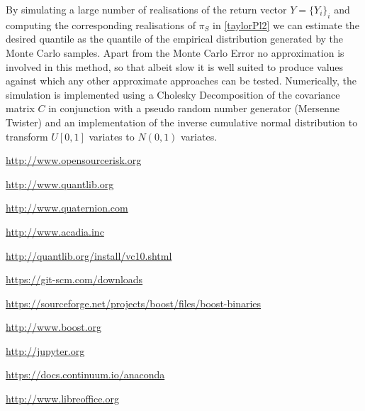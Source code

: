 \documentclass[12pt, a4paper]{article}
\begin{document}
{\begin{appendix}
By simulating a large number of realisations of the return vector $Y=\{ Y_i \}_i$ and computing the corresponding
realisations of $\pi_S$ in \eqref{taylorPl2} we can estimate the desired quantile as the quantile of the empirical
distribution generated by the Monte Carlo samples. Apart from the Monte Carlo Error no approximation is involved in this
method, so that albeit slow it is well suited to produce values against which any other approximate approaches can be tested. Numerically, the simulation is implemented using a Cholesky Decomposition
of the covariance matrix $C$ in conjunction with a pseudo random number generator (Mersenne Twister) and an
implementation of the inverse cumulative normal distribution to transform $U[0,1]$ variates to $N(0,1)$ variates.

\end{appendix}


\begin{thebibliography}{*}

 \url{http://www.opensourcerisk.org}

 \url{http://www.quantlib.org}
 
 \url{http://www.quaternion.com}

 \url{http://www.acadia.inc}

 \url{http://quantlib.org/install/vc10.shtml}


 \url{https://git-scm.com/downloads}

 \url{https://sourceforge.net/projects/boost/files/boost-binaries}

 \url{http://www.boost.org}

 \url{http://jupyter.org}

 \url{https://docs.continuum.io/anaconda}

 \url{http://www.libreoffice.org}



\end{thebibliography}}
\end{document}
